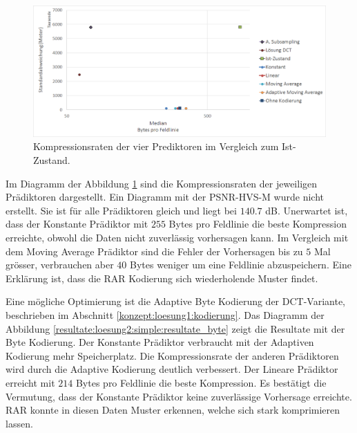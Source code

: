 \begin{figure}[!htbp]
	\center
	\includegraphics[width=1\textwidth,keepaspectratio]{./pictures/resultate/loesung2/variante0/resultate.png}
	\caption{Kompressionsraten der vier Prediktoren im Vergleich zum Ist-Zustand.}
	\label{resultate:loesung2:simple:resultate}
\end{figure}
Im Diagramm der Abbildung \ref{resultate:loesung2:simple:resultate} sind die Kompressionsraten der jeweiligen Prädiktoren dargestellt. Ein Diagramm mit der PSNR-HVS-M wurde nicht erstellt. Sie ist für alle Prädiktoren gleich und liegt bei $140.7$ dB. Unerwartet ist, dass der Konstante Prädiktor mit $255$ Bytes pro Feldlinie die beste Kompression erreichte, obwohl die Daten nicht zuverlässig vorhersagen kann. Im Vergleich mit dem Moving Average Prädiktor sind die Fehler der Vorhersagen 
bis zu $5$ Mal grösser, verbrauchen aber $40$ Bytes weniger um eine Feldlinie abzuspeichern. Eine Erklärung ist, dass die RAR Kodierung sich wiederholende Muster findet.

Eine mögliche Optimierung ist die Adaptive Byte Kodierung der DCT-Variante, beschrieben im Abschnitt \ref{konzept:loesung1:kodierung}. Das Diagramm der Abbildung \ref{resultate:loesung2:simple:resultate_byte} zeigt die Resultate mit der Byte Kodierung. Der Konstante Prädiktor verbraucht mit der Adaptiven Kodierung mehr Speicherplatz. Die Kompressionsrate der anderen Prädiktoren wird durch die Adaptive Kodierung deutlich verbessert. Der Lineare Prädiktor erreicht mit $214$ Bytes pro Feldlinie die beste Kompression. Es bestätigt die Vermutung, dass der Konstante Prädiktor keine zuverlässige Vorhersage erreichte. RAR konnte in diesen Daten Muster erkennen, welche sich stark komprimieren lassen.

